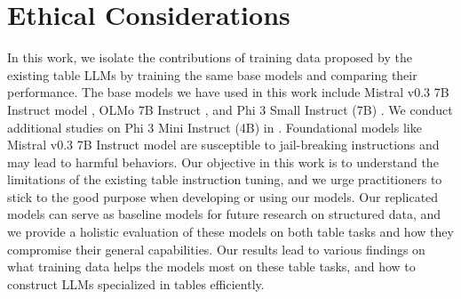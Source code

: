 \documentclass[11pt]{article}
\begin{document}



\section*{Ethical Considerations}
In this work, we isolate the contributions of training data proposed by the existing table LLMs by training the same base models and comparing their performance.
The base models we have used in this work include Mistral v0.3 7B Instruct model \citep{jiang2023mistral}, OLMo 7B Instruct \citep{groeneveld2024olmo}, and Phi 3 Small Instruct (7B) \citep{abdin2024phi}.
We conduct additional studies on Phi 3 Mini Instruct (4B) in .
Foundational models like Mistral v0.3 7B Instruct model are susceptible to jail-breaking instructions \citep{wei2024jailbroken} and may lead to harmful behaviors.
Our objective in this work is to understand the limitations of the existing table instruction tuning, and we urge practitioners to stick to the good purpose when developing or using our models.
Our replicated models can serve as baseline models for future research on structured data, and we provide a holistic evaluation of these models on both table tasks and how they compromise their general capabilities.
Our results lead to various findings on what training data helps the models most on these table tasks, and how to construct LLMs specialized in tables efficiently.
\end{document}
